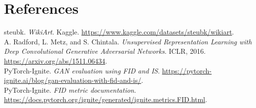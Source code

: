 \documentclass{article}
\begin{document}
\vspace{-3pt}
\section*{References}
\vspace{-3pt}
{\footnotesize\raggedright
\noindent [1] steubk. \emph{WikiArt}. Kaggle.
\url{https://www.kaggle.com/datasets/steubk/wikiart}.\\
\noindent [2] A. Radford, L. Metz, and S. Chintala. \emph{Unsupervised Representation
Learning with Deep Convolutional Generative Adversarial Networks}. ICLR, 2016.
\url{https://arxiv.org/abs/1511.06434}.\\
\noindent [3] PyTorch-Ignite. \emph{GAN evaluation using FID and IS}.
\url{https://pytorch-ignite.ai/blog/gan-evaluation-with-fid-and-is/}.\\
\noindent [4] PyTorch-Ignite. \emph{FID metric documentation}.
\url{https://docs.pytorch.org/ignite/generated/ignite.metrics.FID.html}.\par
}
\end{document}
